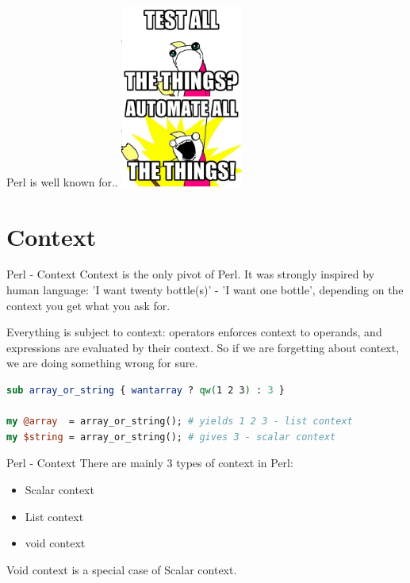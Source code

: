 \documentclass[10pt]{beamer}
\begin{document}
\begin{frame}{Perl is well known for..}
    \center \includegraphics[width=4cm]{images/Test_All_The_Things.png}
\end{frame}


\section{Context}

\begin{frame}[fragile]{Perl - Context}
Context is the only pivot of Perl. It was strongly inspired by human language: 'I want twenty bottle(s)' - 'I want one bottle', depending on the context you get what you ask for.

Everything is subject to context: operators enforces context to operands, and expressions are evaluated by their context. So if we are forgetting about context, we are doing something wrong for sure.
\begin{lstlisting}[language=perl]
sub array_or_string { wantarray ? qw(1 2 3) : 3 }

my @array  = array_or_string(); # yields 1 2 3 - list context
my $string = array_or_string(); # gives 3 - scalar context
\end{lstlisting}

\end{frame}

\begin{frame}[fragile]{Perl - Context}
There are mainly 3 types of context in Perl:

\begin{itemize}
    \item Scalar context
    \item List context
    \item void context
\end{itemize}

Void context is a special case of Scalar context.

\end{frame}
\end{document}
